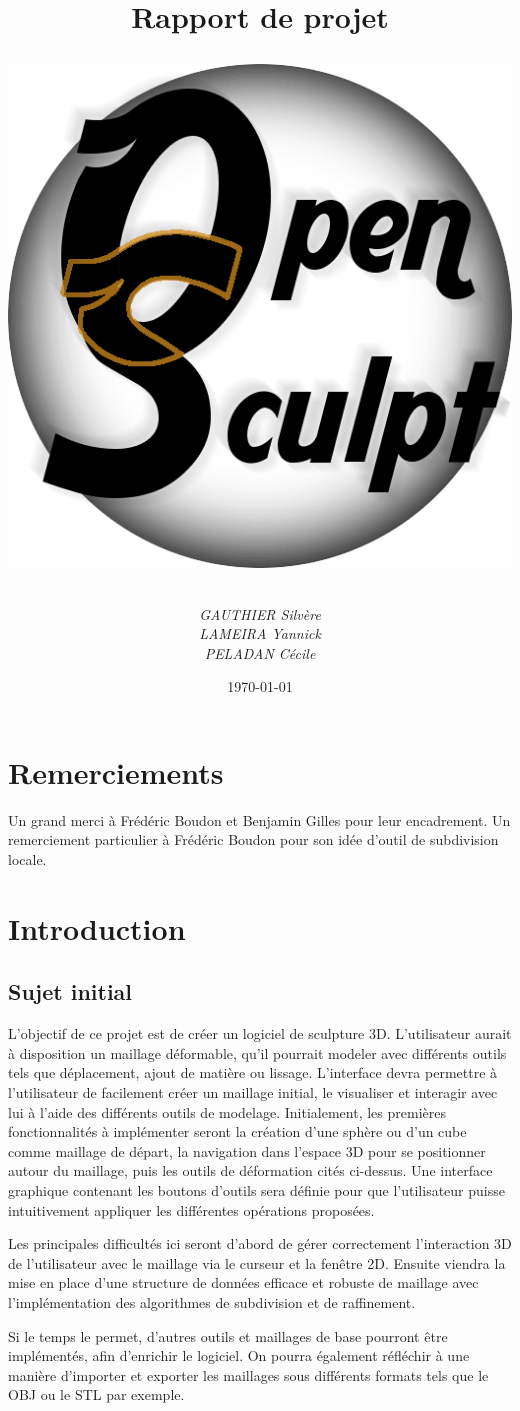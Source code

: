 \documentclass[a4paper]{memoir}
\title{
	\textbf{Rapport de projet}
	\bigskip
	\begin{center}
		\includegraphics[scale=0.25]{img/OpenSculpt.png}
	\end{center}
}
\author{\emph{GAUTHIER Silvère}\\\emph{LAMEIRA Yannick}\\\emph{PELADAN Cécile}}
\date{\today}
\begin{document}
	\maketitle
	\newpage
	\tableofcontents

	\chapter{Remerciements}

		Un grand merci à Frédéric Boudon et Benjamin Gilles pour leur encadrement.
		Un remerciement particulier à Frédéric Boudon pour son idée d'outil de subdivision locale.

	\chapter{Introduction}
		
		\section{Sujet initial}
			L'objectif de ce projet est de créer un logiciel de sculpture 3D. L'utilisateur aurait à disposition un maillage déformable, qu'il pourrait 
			modeler avec différents outils tels que déplacement, ajout de matière ou lissage. L'interface devra permettre à l'utilisateur de facilement 
			créer un maillage initial, le visualiser et interagir avec lui à l'aide des différents outils de modelage. Initialement, les premières 
			fonctionnalités à implémenter seront la création d'une sphère ou d'un cube comme maillage de départ, la navigation dans l'espace 3D pour se 
			positionner autour du maillage, puis les outils de déformation cités ci-dessus. Une interface graphique contenant les boutons d'outils sera 
			définie pour que l'utilisateur puisse intuitivement appliquer les différentes opérations proposées.

			Les principales difficultés ici seront d'abord de gérer correctement l'interaction 3D de l'utilisateur avec le maillage via le curseur et la 
			fenêtre 2D. Ensuite viendra la mise en place d'une structure de données efficace et robuste de maillage avec l'implémentation des algorithmes 
			de subdivision et de raffinement.

			Si le temps le permet, d'autres outils et maillages de base pourront être implémentés, afin d'enrichir le logiciel. On pourra également 
			réfléchir à une manière d'importer et exporter les maillages sous différents formats tels que le OBJ ou le STL par exemple.
\end{document}
